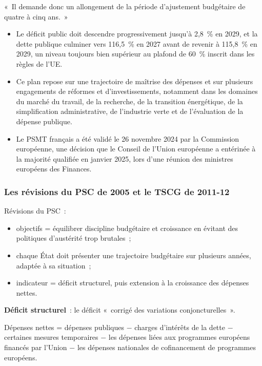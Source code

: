 \begin{remark}
  «~Il demande donc un allongement de la période d'ajustement budgétaire de quatre à
  cinq ans.~»
\end{remark}

\begin{itemize}
  \item Le déficit public doit descendre progressivement jusqu'à 2,8~\% en 2029, et la
    dette publique culminer vers 116,5~\% en 2027 avant de revenir à 115,8~\% en 2029,
    un niveau toujours bien supérieur au plafond de 60~\% inscrit dans les règles de
    l'UE.
  \item Ce plan repose sur une trajectoire de maîtrise des dépenses et sur plusieurs
    engagements de réformes et d'investissements, notamment dans les domaines du marché
    du travail, de la recherche, de la transition énergétique, de la simplification
    administrative, de l'industrie verte et de l'évaluation de la dépense publique.
  \item Le PSMT français a été validé le 26 novembre 2024 par la Commission européenne,
    une décision que le Conseil de l'Union européenne a entérinée à la majorité
    qualifiée en janvier 2025, lors d'une réunion des ministres européens des Finances.
\end{itemize}

\subsubsection{Les révisions du PSC de 2005 et le TSCG de 2011-12}

Révisions du PSC~:
\begin{itemize}
  \item objectifs = équilibrer discipline budgétaire et croissance en évitant des
    politiques d'austérité trop brutales~;
  \item chaque État doit présenter une trajectoire budgétaire sur plusieurs années,
    adaptée à sa situation~;
  \item indicateur = déficit structurel, puis extension à la croissance des dépenses
    nettes.
\end{itemize}

\begin{definition}
  \textbf{Déficit structurel}~: le déficit «~corrigé des variations conjoncturelles~».
\end{definition}

\begin{definition}
  Dépenses nettes = dépenses publiques $-$ charges d'intérêts de la dette $-$ certaines
  mesures temporaires $-$ les dépenses liées aux programmes européens financés par
  l'Union $-$ les dépenses nationales de cofinancement de programmes européens.
\end{definition}

